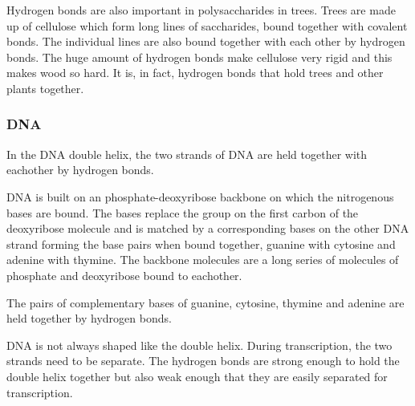\documentclass[../mit-general-chemistry.tex]{subfiles}
\begin{document}
Hydrogen bonds are also important in polysaccharides in trees. Trees
are made up of cellulose which form long lines of saccharides, bound
together with covalent bonds. The individual lines are also bound together with
each other by hydrogen bonds. The huge amount of hydrogen bonds make
cellulose very rigid and this makes wood so hard. It is, in fact,
hydrogen bonds that hold trees and other plants together.



\subsubsection{DNA}

In the DNA double helix, the two strands of DNA are held together with
eachother by hydrogen bonds.

DNA is built on an phosphate-deoxyribose backbone on which the
nitrogenous bases are bound. The bases replace the  group on
the first carbon of the deoxyribose molecule and is matched by a
corresponding bases on the other DNA strand forming the base pairs
when bound together, guanine with cytosine and adenine with
thymine. The backbone molecules are a long series of molecules of
phosphate and deoxyribose bound to eachother.

The pairs of complementary bases of guanine, cytosine, thymine and
adenine are held together by hydrogen bonds.

DNA is not always shaped like the double helix. During transcription,
the two strands need to be separate. The hydrogen bonds are strong
enough to hold the double helix together but also weak enough that
they are easily separated for transcription.
\end{document}
